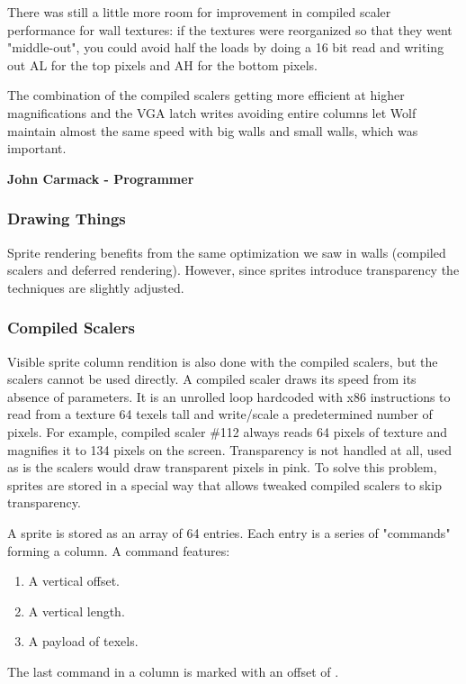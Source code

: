 \begin{fancyquotes}
There was still a little more room for improvement in compiled scaler performance for wall textures:  if the textures were reorganized so that they went "middle-out", you could avoid half the loads by doing a 16 bit read and writing out AL for the top pixels and AH for the bottom pixels.\\
\par 
The combination of the compiled scalers getting more efficient at higher magnifications and the VGA latch writes avoiding entire columns let Wolf maintain almost the same speed with big walls and small walls, which was important.\\
\par
\textbf{John Carmack - Programmer}
 \end{fancyquotes}


\subsubsection{Drawing Things}
Sprite rendering benefits from the same optimization we saw in walls (compiled scalers and deferred rendering). However, since sprites introduce transparency the techniques are slightly adjusted.

\subsubsection{Compiled Scalers}
Visible sprite column rendition is also done with the compiled scalers, but the scalers cannot be used directly. A compiled scaler draws its speed from its absence of parameters. It is an unrolled loop hardcoded with x86 instructions to read from a texture 64 texels tall and write/scale a predetermined number of pixels. For example, compiled scaler \#112 always reads 64 pixels of texture and magnifies it to 134 pixels on the screen. Transparency is not handled at all, used as is the scalers would draw transparent pixels in pink. To solve this problem, sprites are stored in a special way that allows tweaked compiled scalers to skip transparency.\\
\par
A sprite is stored as an array of 64 entries. Each entry is a series of "commands" forming a column. A command features:
\begin{enumerate}
 \item A vertical offset.
 \item A vertical length.
 \item A payload of texels.
 \end{enumerate}
\par
The last command in a column is marked with an offset of .\\
\par

